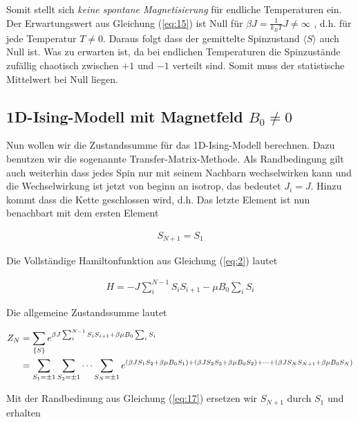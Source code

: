 Somit stellt sich \textit{keine spontane Magnetisierung} für endliche Temperaturen ein.\\

Der Erwartungswert aus Gleichung (\ref{eq:15}) ist Null für \(\beta J=\frac{1}{k_BT} J \ne \infty \) , d.h. für jede Temperatur \(T\ne 0\). Daraus folgt dass der gemittelte Spinzustand \(\langle S \rangle\)  auch Null ist. Was zu erwarten ist, da bei endlichen Temperaturen die Spinzustände zufällig chaotisch zwischen \(+ 1\) und \(-1\) verteilt sind. Somit muss der statistische Mittelwert bei Null liegen.


\subsection*{1D-Ising-Modell mit Magnetfeld $B_0\ne 0$}

Nun wollen wir die Zustandssumme für das 1D-Ising-Modell berechnen. Dazu benutzen wir die sogenannte Transfer-Matrix-Methode. Als Randbedingung gilt auch weiterhin dass jedes Spin nur mit seinem Nachbarn wechselwirken kann und die Wechselwirkung ist jetzt von beginn an isotrop, das bedeutet \(J_i = J\). Hinzu kommt dass die Kette geschlossen wird, d.h. Das letzte Element ist nun benachbart mit dem ersten Element

\begin{align}
  \label{eq:17}
  S_{N+1} = S_1
\end{align}

Die Vollständige Hamiltonfunktion aus Gleichung (\ref{eq:2}) lautet

\begin{align}
  \label{eq:18}
    H = - J \sum_{i}^{N-1} S_iS_{i+1} - \mu B_0 \sum_i S_i
\end{align}

Die allgemeine Zustandssumme lautet

\begin{align}
  \label{eq:19}
  Z_N &= \sum_{\{S\}} e^{\beta J \sum_{i}^{N-1} S_iS_{i+1} + \beta \mu B_0 \sum_i S_i }  \notag\\
&=\sum_{S_1=\pm 1}\sum_{S_2=\pm 1}\cdots \sum_{S_N=\pm 1} e^{(\beta J S_1 S_{2} + \beta \mu B_0 S_1) + (\beta J S_2 S_{3} + \beta \mu B_0 S_2) +\dots+ (\beta J S_N S_{N+1} + \beta \mu B_0 S_N) } 
\end{align}

Mit der Randbedinung aus Gleichung (\ref{eq:17}) ersetzen wir \(S_{N+1}\) durch \(S_1\) und erhalten

